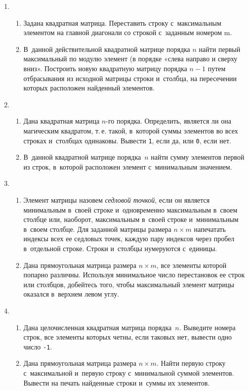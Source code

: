\documentclass{article}
\newcommand{\textex}[1]{\texttt{\color{ForestGreen}#1}}
\begin{document}
\begin{enumerate}[label={}, leftmargin=0pt, itemindent=0pt]
\item
\begin{enumerate}[label=\arabic{enumi}.\arabic*.] %
  \item
  Задана квадратная матрица. Переставить строку с~максимальным элементом на главной диагонали со строкой с~заданным номером m.
  \item
  В~данной действительной квадратной матрице порядка $n$ найти первый максимальный по модулю элемент (в порядке «слева направо и сверху вниз». Построить новую квадратную матрицу порядка $n-1$ путем отбрасывания из исходной матрицы строки и~столбца, на пересечении которых расположен найденный элементов.
\end{enumerate}

\item
\begin{enumerate}[label=\arabic{enumi}.\arabic*.] %
  \item
  Дана квадратная матрица $n$-го порядка. Определить, является ли она магическим квадратом, т.\,е. такой, в~которой суммы элементов во всех строках и~столбцах одинаковы. Вывести \textex{1}, если да, или \texttt{0}, если нет.
  \item
  В~данной квадратной матрице порядка~$n$ найти сумму элементов первой из строк, в~которой расположен элемент с~минимальным значением.
\end{enumerate}

\item
\begin{enumerate}[label=\arabic{enumi}.\arabic*.] %
  \item
  Элемент матрицы назовем \emph{седловой точкой}, если он является минимальным в~своей строке и~одновременно максимальным в~своем столбце или, наоборот,  максимальным в~своей строке и~минимальным в~своем столбце. Для заданной  матрицы размера $n\times m$ напечатать индексы всех ее седловых точек, каждую пару индексов через пробел в~отдельной строке. Строки и~столбцы нумеруются с~единицы.
  \item
  Дана прямоугольная матрица размера $n × m$, все элементы которой попарно различны. Используя минимальное число перестановок ее строк или столбцов, добейтесь того, чтобы максимальный элемент матрицы оказался в~верхнем левом углу.
\end{enumerate}

\item
\begin{enumerate}[label=\arabic{enumi}.\arabic*.] %
\item
  Дана целочисленная квадратная матрица порядка~$n$. Выведите номера строк, все элементы которых четны, если таковых нет, вывести одно число \textex{-1}.
  \item
  Дана прямоугольная матрица размера $n × m$. Найти первую строку с~максимальной и~первую строку с~минимальной суммой элементов. Вывести на печать найденные строки и~суммы их элементов.
\end{enumerate}


\end{enumerate}
\end{document}
